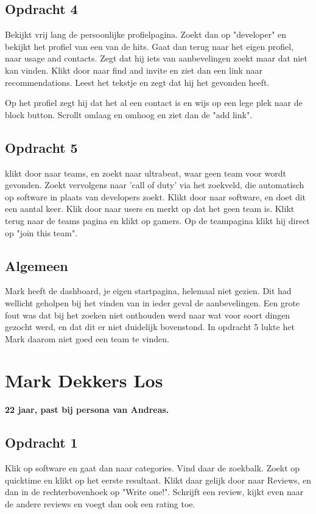 \subsection{Opdracht 4}
Bekijkt vrij lang de persoonlijke profielpagina. Zoekt dan op "developer" en bekijkt het profiel van een van de hits. Gaat dan terug naar het eigen profiel, naar usage and contacts. Zegt dat hij iets van aanbevelingen zoekt maar dat niet kan vinden. Klikt door naar find and invite en ziet dan een link naar recommendations. Leest het tekstje en zegt dat hij het gevonden heeft.

Op het profiel zegt hij dat het al een contact is en wijs op een lege plek naar de block button. Scrollt omlaag en omhoog en ziet dan de "add link".

\subsection{Opdracht 5}
klikt door naar teams, en zoekt naar ultrabeat, waar geen team voor wordt gevonden. Zoekt vervolgens naar 'call of duty' via het zoekveld, die automatisch op software in plaats van developers zoekt. Klikt door naar software, en doet dit een aantal keer. Klik door naar users en merkt op dat het geen team is. Klikt terug naar de teams pagina en klikt op gamers. Op de teampagina klikt hij direct op "join this team".

\subsection{Algemeen}
Mark heeft de dashboard, je eigen startpagina, helemaal niet gezien. Dit had wellicht geholpen bij het vinden van in ieder geval de aanbevelingen. Een grote fout was dat bij het zoeken niet onthouden werd naar wat voor soort dingen gezocht werd, en dat dit er niet duidelijk bovenstond. In opdracht 5 lukte het Mark daarom niet goed een team te vinden.

\section{Mark Dekkers Los}
\textbf{22 jaar, past bij persona van Andreas.}

\subsection{Opdracht 1}
Klik op software en gaat dan naar categories. Vind daar de zoekbalk. Zoekt op quicktime en klikt op het eerste resultaat. Klikt daar gelijk door naar Reviews, en dan in de rechterbovenhoek op "Write one!". Schrijft een review, kijkt even naar de andere reviews en voegt dan ook een rating toe.

